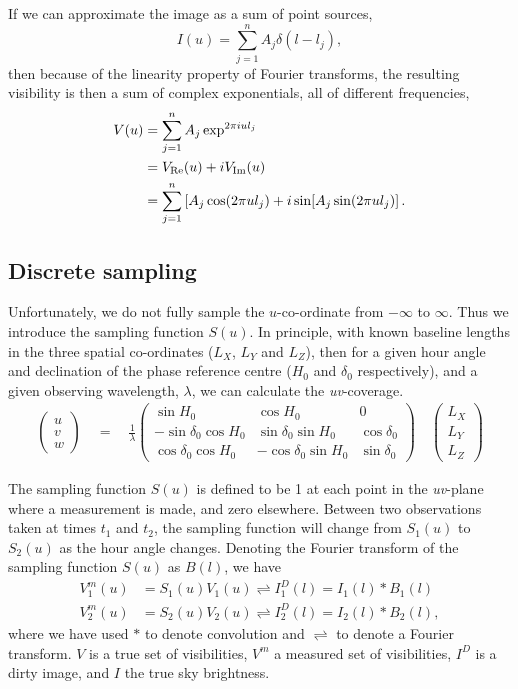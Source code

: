 \documentclass{article}
\begin{document}
If we can approximate the image as a sum of point sources,
\begin{equation}
I(u) = \sum_{j=1}^{n} A_j \delta(l-l_j),
\end{equation}
then because of the linearity property of Fourier transforms, the
resulting visibility is then a sum of complex exponentials, all of
different frequencies,
\begin{equation}
\begin{split}
V(u) &= \sum_{j=1}^{n} A_j \exp^{2\pi iul_j}\\
&= V_{\rm Re}(u) + iV_{\rm Im}(u)\\
&= \sum_{j=1}^{n} \left[A_j\cos(2\pi ul_j) + i\sin[A_j\sin(2\pi ul_j)\right].
\label{eq:source_vis}
\end{split}
\end{equation}

\subsection{Discrete sampling}
Unfortunately, we do not fully sample the $u$-co-ordinate from
$-\infty$ to $\infty$.  Thus we introduce the sampling function
$S(u)$.  In principle, with known baseline lengths in the three
spatial co-ordinates ($L_X$, $L_Y$ and $L_Z$), then for a given hour
angle and declination of the phase reference centre ($H_0$ and
$\delta_0$ respectively), and a given observing wavelength, $\lambda$,
we can calculate the {\it uv}-coverage.
\begin{gather}
\begin{pmatrix}u \\ v \\ w\end{pmatrix} \quad = \quad \frac{1}{\lambda}
\begin{pmatrix}\sin H_0 & \cos H_0 & 0 \\ -\sin \delta_0\cos H_0 &
  \sin\delta_0 \sin H_0 & \cos\delta_0 \\ \cos\delta_0\cos H_0 &
  -\cos\delta_0\sin H_0 & \sin\delta_0\end{pmatrix} \quad
\begin{pmatrix}L_X \\ L_Y \\ L_Z\end{pmatrix}
\end{gather}

The sampling function $S(u)$ is defined to be 1 at each point in the
{\it uv}-plane where a measurement is made, and zero elsewhere.
Between two observations taken at times $t_1$ and $t_2$, the sampling
function will change from $S_1(u)$ to $S_2(u)$ as the hour angle
changes.  Denoting the Fourier transform of the sampling function
$S(u)$ as $B(l)$, we have
\begin{align}
V^m_1(u) &= S_1(u) V_1(u) \rightleftharpoons I^D_1(l) = I_1(l) \ast
B_1(l)\\
V^m_2(u) &= S_2(u) V_2(u) \rightleftharpoons I^D_2(l) = I_2(l) \ast
B_2(l),
\end{align}
where we have used $\ast$ to denote convolution and
$\rightleftharpoons$ to denote a Fourier transform.  $V$ is a true set
of visibilities, $V^m$ a measured set of visibilities, $I^D$ is a
dirty image, and $I$ the true sky brightness.
\end{document}
